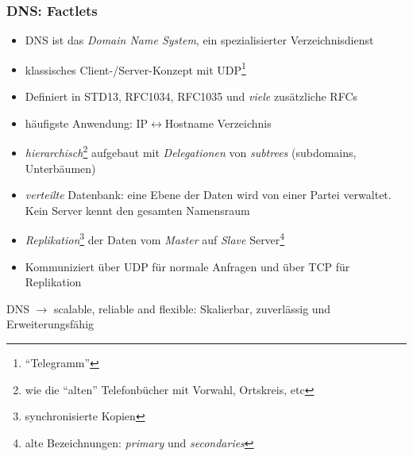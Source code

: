 \documentclass[ignorenonframetext]{beamer}
\begin{document}
\begin{frame}
\frametitle{DNS: Factlets}
\begin{itemize}
	\item{DNS ist das {\em Domain Name System}, ein spezialisierter Verzeichnisdienst}
	\item{klassisches Client-/Server-Konzept mit UDP\footnote{``Telegramm''}}
	\item{Definiert in STD13, RFC1034, RFC1035 und {\em viele} zus\"atzliche RFCs}
	\item{h\"aufigste Anwendung: IP$\leftrightarrow$Hostname Verzeichnis}
	\item{{\em hierarchisch}{}\footnote{wie die ``alten'' Telefonb\"ucher mit Vorwahl, Ortskreis, etc} aufgebaut mit {\em Delegationen} von {\em subtrees} (subdomains, Unterb\"aumen)}
	\item{{\em verteilte} Datenbank: eine Ebene der Daten wird von einer Partei verwaltet. Kein Server kennt den gesamten Namensraum}
	\item{{\em Replikation}{}\footnote{synchronisierte Kopien} der Daten vom {\em Master} auf {\em Slave} Server\footnote{alte Bezeichnungen: {\em primary} und {\em secondaries}}}
	\item{Kommuniziert \"uber UDP f\"ur normale Anfragen und \"uber TCP f\"ur Replikation}
\end{itemize}
\begin{small}
\begin{block}{DNS}
$\rightarrow$ scalable, reliable and flexible: Skalierbar, zuverl\"assig und Erweiterungsf\"ahig
\end{block}
\end{small}
\end{frame}
\end{document}
